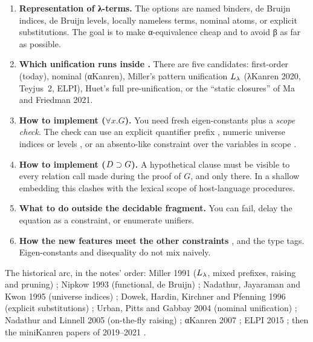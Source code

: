\begin{enumerate}[label=\textbf{Q\arabic*.}]
  \item \textbf{Representation of λ-terms.} The options are named binders, de Bruijn indices, de
    Bruijn levels, locally nameless terms, nominal atoms, or explicit substitutions. The goal is to
    make α-equivalence cheap and to avoid β as far as possible.
  \item \textbf{Which unification runs inside .} There are five candidates: first-order (today),
    nominal (αKanren), Miller's pattern unification $L_\lambda$ (λKanren 2020, Teyjus~2, ELPI), Huet's full
    pre-unification, or the \enquote{static closures} of Ma and Friedman 2021.
  \item \textbf{How to implement  ($\forall x.G$).} You need fresh eigen-constants
    plus a \emph{scope check}. The check can use an explicit quantifier prefix
    \cite{Miller1991,MaLuFriedman2020}, numeric universe indices or levels
    \cite{NadathurJayaramanKwon1995,DunchevEtAl2015}, or an absento-like constraint over the
    variables in scope \cite{HemannByrdFriedman2013}.
  \item \textbf{How to implement  ($D\supset G$).} A hypothetical clause must be visible
    to every relation call made during the proof of $G$, and only there. In a shallow embedding this
    clashes with the lexical scope of host-language procedures.
  \item \textbf{What to do outside the decidable fragment.} You can fail, delay the equation as a
    constraint, or enumerate unifiers.
  \item \textbf{How the new features meet the other constraints} ,  and the
    type tags. Eigen-constants and disequality do not mix naively.
\end{enumerate}

The historical arc, in the notes' order: Miller 1991 ($L_\lambda$, mixed prefixes, raising and pruning)
\cite{Miller1991}; Nipkow 1993 (functional, de Bruijn) \cite{Nipkow1993}; Nadathur, Jayaraman and Kwon
1995 (universe indices) \cite{NadathurJayaramanKwon1995}; Dowek, Hardin, Kirchner and Pfenning 1996
(explicit substitutions) \cite{DowekHardinKirchnerPfenning1996}; Urban, Pitts and Gabbay 2004 (nominal
unification) \cite{UrbanPittsGabbay2004}; Nadathur and Linnell 2005 (on-the-fly raising)
\cite{NadathurLinnell2005}; αKanren 2007 \cite{ByrdFriedman2007}; ELPI 2015 \cite{DunchevEtAl2015};
then the miniKanren papers of 2019--2021
\cite{Moiseenko2019,MaLuFriedman2020,MaFriedman2021,JinEtAl2021}.

